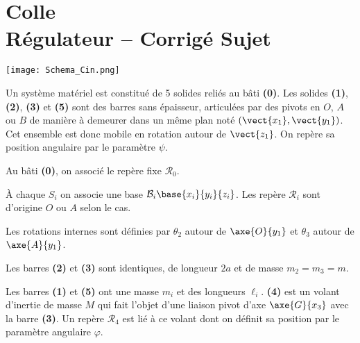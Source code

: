 \chapter*{Colle  \\ 
Régulateur -- \ifprof Corrigé \else Sujet \fi}

\iflivret {} \else
\ifprof  {} \else \fi
\fi

\setcounter{question}{0}



\begin{marginfigure}
\texttt{[image: Schema\_Cin.png]}
\end{marginfigure}


Un système matériel est constitué de 5 solides reliés au bâti \textbf{(0)}. Les solides \textbf{(1)}, \textbf{(2)}, \textbf{(3)} et \textbf{(5)} sont des barres sans épaisseur, articulées par des pivots en $O$, $A$ ou $B$ de manière à demeurer dans un même plan noté $ \left(\vect{x_1},\vect{y_1}\right)$. Cet ensemble est donc mobile en rotation autour de $\vect{z_1}$. On repère sa position angulaire par le paramètre $\psi$. 

Au bâti \textbf{(0)}, on associé le repère fixe $\mathcal{R}_0$. 

À chaque $S_i$ on associe une base $\mathcal{B}_i\base{x_i}{y_i}{z_i}$. Les repère $\mathcal{R}_i$ sont d'origine $O$ ou $A$ selon le cas. 

Les rotations internes sont définies par $\theta_2$ autour de $\axe{O}{y_1}$ et $\theta_3$ autour de $\axe{A}{y_1}$.

Les barres \textbf{(2)} et \textbf{(3)} sont identiques, de longueur $2a$ et de masse $m_2=m_3=m$.

Les barres \textbf{(1)} et \textbf{(5)} ont une masse $m_i$ et des longueurs $\ell_i$. \textbf{(4)} est un volant d'inertie de masse $M$ qui fait l'objet d'une liaison pivot d'axe $\axe{G}{x_3}$ avec la barre \textbf{(3)}. Un repère $\mathcal{R}_4$ est lié à ce volant dont on définit sa position par le paramètre angulaire $\varphi$.

